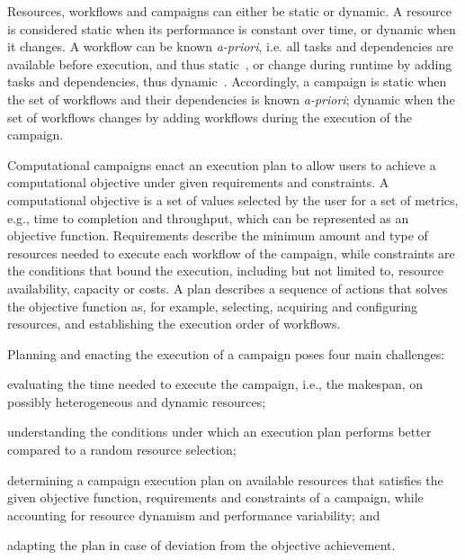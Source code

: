 Resources, workflows and campaigns can either be static or dynamic. A resource 
is considered static when its performance is constant over time, or dynamic when 
it changes. A workflow can be known \textit{a-priori}, i.e. all tasks and 
dependencies are available before execution, and thus static~\cite{paraskevakos2019workflow}, or 
change during runtime by adding tasks and dependencies, thus dynamic~\cite{dakka2018high}. 
Accordingly, a campaign is static when the set of workflows and their dependencies is known \textit{a-priori}; dynamic 
when the set of workflows changes by adding workflows during the execution of the campaign.

Computational campaigns enact an execution plan to allow users to achieve a computational 
objective under given requirements and constraints. A computational objective is 
a set of values selected by the user for a set of metrics, e.g., time to 
completion and throughput, which can be represented as an objective 
function. Requirements describe the minimum amount and type of resources needed 
to execute each workflow of the campaign, while constraints are the conditions 
that bound the execution, including but not limited to, resource 
availability, capacity or costs. A plan describes a sequence of actions that solves the objective function as, for example, selecting, acquiring and configuring resources, and establishing the execution order of workflows.

Planning and enacting the execution of a campaign poses four main 
challenges: 
\begin{inparaenum}[(i)]
\item evaluating the time needed to execute the campaign, i.e., the makespan, on 
possibly heterogeneous and dynamic resources;
\item  understanding the conditions under which an execution plan performs 
better compared to a random resource selection;
\item determining a campaign execution plan on available resources that 
satisfies the given objective function, requirements 
and constraints of a campaign, while accounting for resource dynamism and performance 
variability; and
\item adapting the plan in case of deviation from the objective achievement.
\end{inparaenum}

